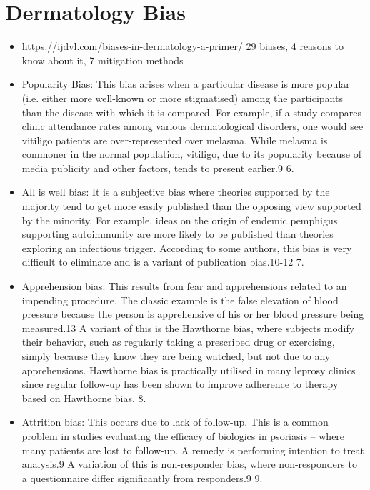 \documentclass[12pt, a4paper, oneside]{book}   	%
\begin{document}
		\section{Dermatology Bias}
			\begin{itemize}
				\item https://ijdvl.com/biases-in-dermatology-a-primer/ 29 biases, 4 reasons to know about it, 7 mitigation methods \autocite{Chakraborty_2023}
				\item Popularity Bias: This bias arises when a particular disease is more popular (i.e. either more well-known or more stigmatised) among the participants than the disease with which it is compared. For example, if a study compares clinic attendance rates among various dermatological disorders, one would see vitiligo patients are over-represented over melasma. While melasma is commoner in the normal population, vitiligo, due to its popularity because of media publicity and other factors, tends to present earlier.9 6. \autocite{Chakraborty_2023}
				\item All is well bias: It is a subjective bias where theories supported by the majority tend to get more easily published than the opposing view supported by the minority. For example, ideas on the origin of endemic pemphigus supporting autoimmunity are more likely to be published than theories exploring an infectious trigger. According to some authors, this bias is very difficult to eliminate and is a variant of publication bias.10-12 7.\autocite{Chakraborty_2023}
				\item  Apprehension bias: This results from fear and apprehensions related to an impending procedure. The classic example is the false elevation of blood pressure because the person is apprehensive of his or her blood pressure being measured.13 A variant of this is the Hawthorne bias, where subjects modify their behavior, such as regularly taking a prescribed drug or exercising, simply because they know they are being watched, but not due to any apprehensions. Hawthorne bias is practically utilised in many leprosy clinics since regular follow-up has been shown to improve adherence to therapy based on Hawthorne bias. 8. \autocite{Chakraborty_2023}
				\item Attrition bias: This occurs due to lack of follow-up. This is a common problem in studies evaluating the efficacy of biologics in psoriasis – where many patients are lost to follow-up. A remedy is performing intention to treat analysis.9 A variation of this is non-responder bias, where non-responders to a questionnaire differ significantly from responders.9 9. \autocite{Chakraborty_2023}

\end{itemize}
\end{document}
